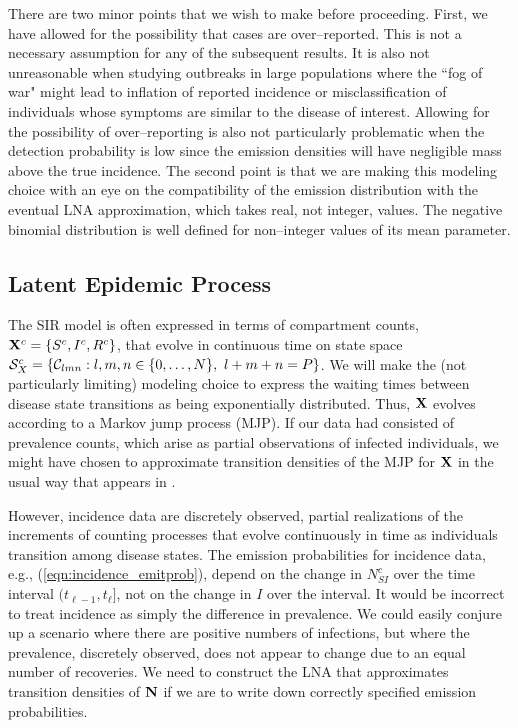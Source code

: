 There are two minor points that we wish to make before proceeding. First, we have allowed for the possibility that cases are over--reported. This is not a necessary assumption for any of the subsequent results. It is also not unreasonable when studying outbreaks in large populations where the ``fog of war" might lead to inflation of reported incidence or misclassification of individuals whose symptoms are similar to the disease of interest. Allowing for the possibility of over--reporting is also not particularly problematic when the detection probability is low since the emission densities will have negligible mass above the true incidence. The second point is that we are making this modeling choice with an eye on the compatibility of the emission distribution with the eventual LNA approximation, which takes real, not integer, values. The negative binomial distribution is well defined for non--integer values of its mean parameter. 

\subsection{Latent Epidemic Process}
\label{subsec:lna_epid_proc}

The SIR model is often expressed in terms of compartment counts, $ \mathbf{X}^c = \lbrace S^c,I^c,R^c\rbrace $, that evolve in continuous time on state space $ \mathcal{S}_X^c = \left \lbrace \mathcal{C}_{lmn}:l,m,n\in\lbrace0,\dots,N\rbrace,\ l+m+n=P\right \rbrace $. We will make the (not particularly limiting) modeling choice to express the waiting times between disease state transitions as being exponentially distributed. Thus, $ \mathbf{X} $ evolves according to a Markov jump process (MJP). If our data had consisted of prevalence counts, which arise as partial observations of infected individuals, we might have chosen to approximate transition densities of the MJP for $ \mathbf{X} $ in the usual way that appears in \cite{komorowski2009,fearnhead2014}. 

However, incidence data are discretely observed, partial realizations of the increments of counting processes that evolve continuously in time as individuals transition among disease states. The emission probabilities for incidence data, e.g., (\ref{eqn:incidence_emitprob}), depend on the change in $ N_{SI}^c $ over the time interval $ (t_{\ell-1},t_\ell] $, not on the change in $ I $ over the interval. It would be incorrect to treat incidence as simply the difference in prevalence. We could easily conjure up a scenario where there are positive numbers of infections, but where the prevalence, discretely observed, does not appear to change due to an equal number of recoveries. We need to construct the LNA that approximates transition densities of $ \mathbf{N} $ if we are to write down correctly specified emission probabilities.

